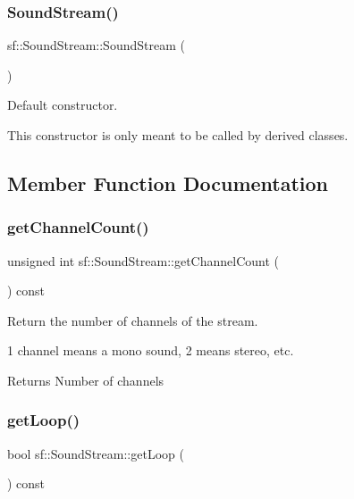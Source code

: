 \subsubsection{\texorpdfstring{Sound\+Stream()}{SoundStream()}}
{\footnotesize\ttfamily sf\+::\+Sound\+Stream\+::\+Sound\+Stream (\begin{DoxyParamCaption}{ }\end{DoxyParamCaption})\hspace{0.3cm}{\ttfamily [protected]}}



Default constructor. 

This constructor is only meant to be called by derived classes. 

\subsection{Member Function Documentation}
\mbox{\label{classsf_1_1_sound_stream_a1f70933912dd9498f4dc99feefed27f3}} 
\subsubsection{\texorpdfstring{get\+Channel\+Count()}{getChannelCount()}}
{\footnotesize\ttfamily unsigned int sf\+::\+Sound\+Stream\+::get\+Channel\+Count (\begin{DoxyParamCaption}{ }\end{DoxyParamCaption}) const}



Return the number of channels of the stream. 

1 channel means a mono sound, 2 means stereo, etc.

\begin{DoxyReturn}{Returns}
Number of channels 
\end{DoxyReturn}
\mbox{\label{classsf_1_1_sound_stream_a49d263f9bbaefec4b019bd05fda59b25}} 
\subsubsection{\texorpdfstring{get\+Loop()}{getLoop()}}
{\footnotesize\ttfamily bool sf\+::\+Sound\+Stream\+::get\+Loop (\begin{DoxyParamCaption}{ }\end{DoxyParamCaption}) const}



